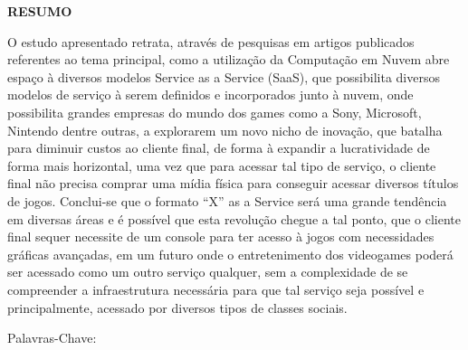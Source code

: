 \thispagestyle{empty}
\begin{Center}
    {\center \bf \MakeUppercase{resumo}}
\end{Center}
    
\begin{justify}
    O estudo apresentado retrata, através de pesquisas em artigos publicados referentes ao tema principal,
     como a utilização da Computação em Nuvem abre espaço à diversos modelos Service as a Service (SaaS), 
     que possibilita diversos modelos de serviço à serem definidos e incorporados junto à nuvem, 
     onde possibilita grandes empresas do mundo dos games como a Sony, Microsoft, Nintendo dentre outras, 
     a explorarem um novo nicho de inovação, que batalha para diminuir custos ao cliente final, de forma à 
     expandir a lucratividade de forma mais horizontal, uma vez que para acessar tal tipo de serviço, o 
     cliente final não precisa comprar uma mídia física para conseguir acessar diversos títulos de jogos. 
     Conclui-se que o formato “X” as a Service será uma grande tendência em diversas áreas e é possível 
     que esta revolução chegue a tal ponto, que o cliente final sequer necessite de um console para ter 
     acesso à jogos com necessidades gráficas avançadas, em um futuro onde o entretenimento dos videogames 
     poderá ser acessado como um outro serviço qualquer, sem a complexidade de se compreender a infraestrutura 
     necessária para que tal serviço seja possível e principalmente, acessado por diversos tipos de classes sociais.
\end{justify}
{Palavras-Chave: \KEYWORDS}
\vspace*{\fill}